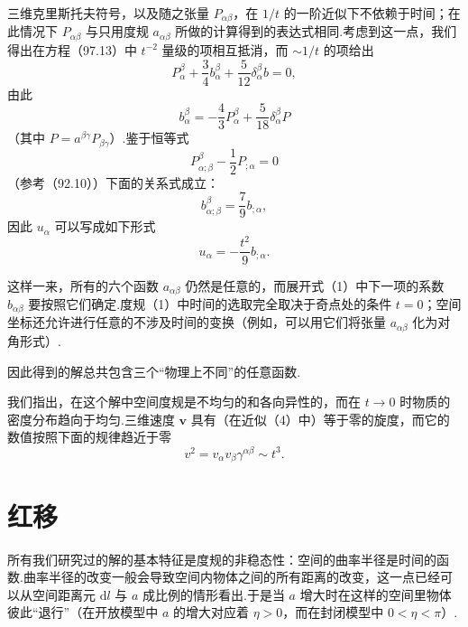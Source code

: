 \begin{xiti}
三维克里斯托夫符号，以及随之张量 $P_{\alpha\beta}$，在 $1/t$ 的一阶近似下不依赖于时间；在此情况下 $P_{\alpha\beta}$ 与只用度规 $a_{\alpha\beta}$ 所做的计算得到的表达式相同.考虑到这一点，我们得出在方程（97.13）中 $t^{-2}$ 量级的项相互抵消，而 $\sim1/t$ 的项给出
\begin{equation*}
  P_{\alpha}^{\beta}+\frac{3}{4}b_{\alpha}^{\beta}
  +\frac{5}{12}\delta_{\alpha}^{\beta}b=0,
\end{equation*}
由此
\begin{equation}\tag{3}
  b_{\alpha}^{\beta}=-\frac{4}{3}P_{\alpha}^{\beta}
  +\frac{5}{18}\delta_{\alpha}^{\beta}P
\end{equation}
（其中 $P=a^{\beta\gamma}P_{\beta\gamma}$）.鉴于恒等式
\begin{equation*}
  P_{\alpha;\beta}^{\beta}-\frac{1}{2}P_{;\alpha}=0
\end{equation*}
（参考（92.10））下面的关系式成立：
\begin{equation*}
  b_{\alpha;\beta}^{\beta}=\frac{7}{9}b_{;\alpha},
\end{equation*}
因此 $u_{\alpha}$ 可以写成如下形式
\begin{equation}\tag{4}
  u_{\alpha}=-\frac{t^{2}}{9}b_{;\alpha}.
\end{equation}

这样一来，所有的六个函数 $a_{\alpha\beta}$ 仍然是任意的，而展开式（1）中下一项的系数 $b_{\alpha\beta}$ 要按照它们确定.度规（1）中时间的选取完全取决于奇点处的条件 $t=0$；空间坐标还允许进行任意的不涉及时间的变换（例如，可以用它们将张量 $a_{\alpha\beta}$ 化为对角形式）.

因此得到的解总共包含三个“物理上不同”的任意函数.

我们指出，在这个解中空间度规是不均匀的和各向异性的，而在 $t\to0$ 时物质的密度分布趋向于均匀.三维速度 $\boldsymbol{v}$ 具有（在近似（4）中）等于零的旋度，而它的数值按照下面的规律趋近于零
\begin{equation*}
  v^{2}=v_{\alpha}v_{\beta}\gamma^{\alpha\beta}\sim t^{3}.
\end{equation*}

\end{xiti}

\section{红移}

所有我们研究过的解的基本特征是度规的非稳态性：空间的曲率半径是时间的函数.曲率半径的改变一般会导致空间内物体之间的所有距离的改变，这一点已经可以从空间距离元 $\mathrm{d}l$ 与 $a$ 成比例的情形看出.于是当 $a$ 增大时在这样的空间里物体彼此“退行”（在开放模型中 $a$ 的增大对应着 $\eta>0$，而在封闭模型中 $0<\eta<\pi$）.

